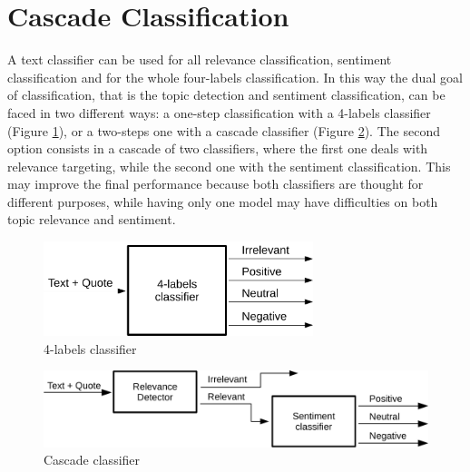 \section{Cascade Classification}

A text classifier can be used for all relevance classification, sentiment classification and for the whole four-labels classification. In this way the dual goal of classification, that is the topic detection and sentiment classification, can be faced in two different ways: a one-step classification with a 4-labels classifier (Figure \ref{fig:4label-class}), or a two-steps one with a cascade classifier (Figure \ref{fig:cascade-class}). The second option consists in a cascade of two classifiers, where the first one deals with relevance targeting, while the second one with the sentiment classification. This may improve the final performance because both classifiers are thought for different purposes, while having only one model may have difficulties on both topic relevance and sentiment.


\begin{figure}[ht]
	\centering
	\includegraphics[width=0.7\textwidth]{figures/draw/blocks_class.pdf}
	\caption{4-labels classifier}
	\label{fig:4label-class}
\end{figure}

\begin{figure}[ht]
	\centering
	\includegraphics[width=1\textwidth]{figures/draw/blocks_cascade.pdf}
	\caption{Cascade classifier}
	\label{fig:cascade-class}
\end{figure}














